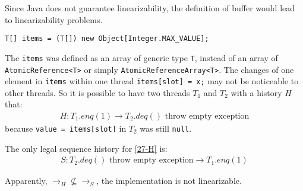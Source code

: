 \documentclass[]{article}
\begin{document}
Since Java does not guarantee linearizability, the definition of buffer would
lead to linearizability problems.
\begin{lstlisting}
T[] items = (T[]) new Object[Integer.MAX_VALUE];
\end{lstlisting}
The \lstinline{items} was defined as an array of generic type \lstinline{T},
instead of an array of \lstinline{AtomicReference<T>} or simply
\lstinline{AtomicReferenceArray<T>}. The changes of one element in
\lstinline{items} within one thread \lstinline{items[slot] = x;} may not be
noticeable to other threads. So it is possible to have two threads $T_1$ and
$T_2$ with a history $H$ that:
\begin{align}
    \label{27-H}
    H: T_1.enq(1) \rightarrow T_2.deq() \text{ throw empty exception}
\end{align}
because \lstinline{value = items[slot]} in $T_2$ was still \lstinline{null}.

The only legal sequence history for \cref{27-H} is:
\begin{align}
    \label{27-S}
    S: T_2.deq() \text{ throw empty exception} \rightarrow T_1.enq(1)
\end{align}

Apparently, $\rightarrow_H \nsubseteq \rightarrow_S$, the implementation is not
linearizable.
\end{document}
